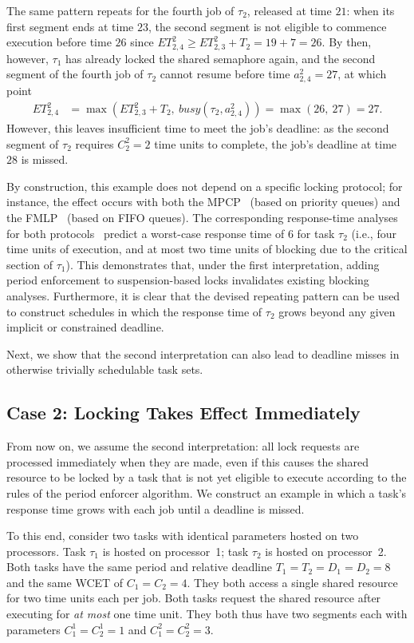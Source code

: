 The same pattern repeats for the fourth job of $\tau_2$, released at time $21$: when its first segment ends at time $23$, the second segment is not eligible to commence execution before time $26$ since $ET_{2,4}^2 \geq ET_{2,3}^2 + T_2 = 19 + 7 = 26$. By then, however, $\tau_1$ has already locked the shared semaphore again, and the second segment of the fourth job of $\tau_2$ cannot resume before time $a^2_{2,4} = 27$, at which point
\begin{align*}
	ET_{2,4}^2 & = \max\left(ET_{2,3}^2 + T_2,\ \mathit{busy}(\tau_2, a^2_{2,4})\right) =\max(26,\ 27) = 27.
\end{align*}
However, this leaves insufficient time to meet the job's deadline: as the second segment of $\tau_2$ requires $C_2^2 = 2$ time units to complete, the job's deadline at time~$28$ is  missed.

By construction, this example does not depend on a specific locking protocol; for instance, the effect occurs with both the MPCP~\cite{Ra:90} (based on priority queues) and the FMLP~\cite{BLBA:07,BA:08} (based on FIFO queues).  The corresponding response-time analyses for both protocols~\cite{Br:13,LNR:09} predict a worst-case response time of $6$ for task $\tau_2$ (i.e., four time units of execution, and at most two time units of blocking due to the critical section of $\tau_1$). 
This demonstrates that, under the first interpretation, adding period enforcement to suspension-based locks invalidates existing blocking analyses. Furthermore, it is clear that the devised repeating pattern can be used to construct schedules in which the response time of $\tau_2$  grows beyond any given implicit or constrained deadline.

Next, we show that the second interpretation can also lead to deadline misses in otherwise trivially schedulable task sets.

\subsection{Case 2: Locking Takes Effect Immediately}
\label{sec:sem-case-2}
 From now on, we assume the second interpretation: all lock requests are processed immediately when they are made, even if this causes the shared resource to be locked by a task that is not yet eligible to execute according to  the rules of the period enforcer algorithm. We construct an example in which a task's response time grows with each job until a deadline is missed.

To this end, consider two tasks with identical parameters hosted on two processors. Task $\tau_1$ is hosted on processor~1; task $\tau_2$ is hosted on processor~2. Both tasks have the same period and relative deadline $T_1 = T_2 = D_1 = D_2 = 8$ and the same WCET of $C_1 = C_2 = 4$. They both access a single shared resource for two time units each per job. Both tasks request the shared resource after executing for \emph{at most} one time unit. They both thus have two segments each with parameters $C_1^1 = C_2^1 = 1$ and $C_1^2 = C_2^2 = 3$. 

